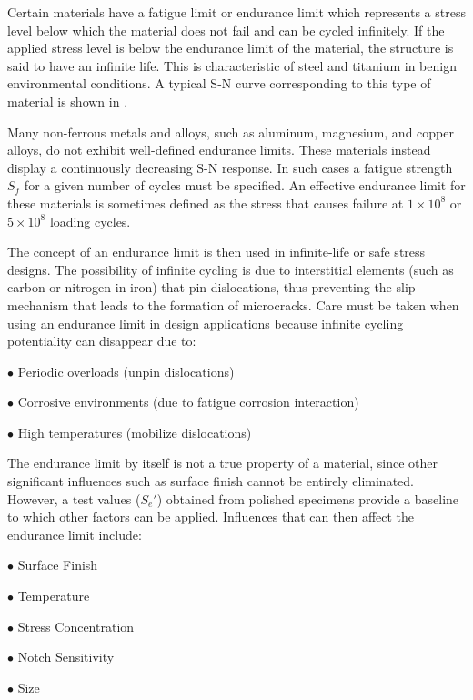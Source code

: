 Certain materials have a fatigue limit or endurance limit which represents a stress level below
which the material does not fail and can be cycled infinitely. If the applied stress level is below
the endurance limit of the material, the structure is said to have an infinite life. This is
characteristic of steel and titanium in benign environmental conditions. A typical S-N curve
corresponding to this type of material is shown in .

Many non-ferrous metals and alloys, such as aluminum, magnesium, and copper alloys, do not
exhibit well-defined endurance limits. These materials instead display a continuously
decreasing S-N response. In such cases a fatigue strength $S_f$ for
a given number of cycles must be specified. An effective endurance limit for these materials is
sometimes defined as the stress that causes failure at $1\times10^8$ or $5\times10^8$ loading cycles.

The concept of an endurance limit is then used in infinite-life or safe stress designs. The possibility of infinite cycling is due to
interstitial elements (such as carbon or nitrogen in iron) that pin dislocations, thus preventing
the slip mechanism that leads to the formation of microcracks. Care must be taken when
using an endurance limit in design applications because infinite cycling potentiality can disappear due to:

\vspace{6pt}
$\bullet$ Periodic overloads (unpin dislocations)

$\bullet$ Corrosive environments (due to fatigue corrosion interaction)

$\bullet$ High temperatures (mobilize dislocations)
\vspace{6pt}     

The endurance limit by itself is not a true property of a material, since other significant influences such
as surface finish cannot be entirely eliminated. However, a test values ($S_e'$) obtained from
polished specimens provide a baseline to which other factors can be applied. Influences that
can then affect the endurance limit include:

\vspace{6pt}
$\bullet$ Surface Finish

$\bullet$ Temperature

$\bullet$ Stress Concentration

$\bullet$ Notch Sensitivity

$\bullet$ Size

